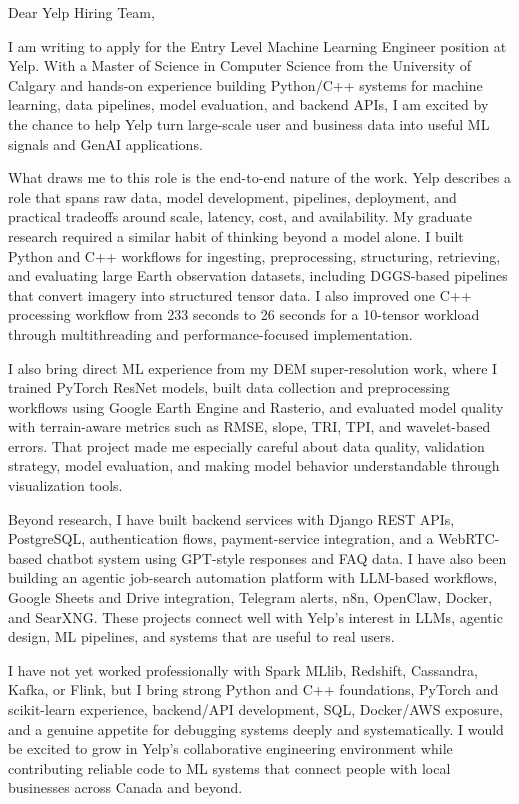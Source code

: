 \documentclass[11pt]{letter}
\begin{document}
\begin{letter}{}

\opening{Dear Yelp Hiring Team,}

I am writing to apply for the Entry Level Machine Learning Engineer position at Yelp. With a Master of Science in Computer Science from the University of Calgary and hands-on experience building Python/C++ systems for machine learning, data pipelines, model evaluation, and backend APIs, I am excited by the chance to help Yelp turn large-scale user and business data into useful ML signals and GenAI applications.

What draws me to this role is the end-to-end nature of the work. Yelp describes a role that spans raw data, model development, pipelines, deployment, and practical tradeoffs around scale, latency, cost, and availability. My graduate research required a similar habit of thinking beyond a model alone. I built Python and C++ workflows for ingesting, preprocessing, structuring, retrieving, and evaluating large Earth observation datasets, including DGGS-based pipelines that convert imagery into structured tensor data. I also improved one C++ processing workflow from 233 seconds to 26 seconds for a 10-tensor workload through multithreading and performance-focused implementation.

I also bring direct ML experience from my DEM super-resolution work, where I trained PyTorch ResNet models, built data collection and preprocessing workflows using Google Earth Engine and Rasterio, and evaluated model quality with terrain-aware metrics such as RMSE, slope, TRI, TPI, and wavelet-based errors. That project made me especially careful about data quality, validation strategy, model evaluation, and making model behavior understandable through visualization tools.

Beyond research, I have built backend services with Django REST APIs, PostgreSQL, authentication flows, payment-service integration, and a WebRTC-based chatbot system using GPT-style responses and FAQ data. I have also been building an agentic job-search automation platform with LLM-based workflows, Google Sheets and Drive integration, Telegram alerts, n8n, OpenClaw, Docker, and SearXNG. These projects connect well with Yelp's interest in LLMs, agentic design, ML pipelines, and systems that are useful to real users.

I have not yet worked professionally with Spark MLlib, Redshift, Cassandra, Kafka, or Flink, but I bring strong Python and C++ foundations, PyTorch and scikit-learn experience, backend/API development, SQL, Docker/AWS exposure, and a genuine appetite for debugging systems deeply and systematically. I would be excited to grow in Yelp's collaborative engineering environment while contributing reliable code to ML systems that connect people with local businesses across Canada and beyond.


\end{letter}
\end{document}
